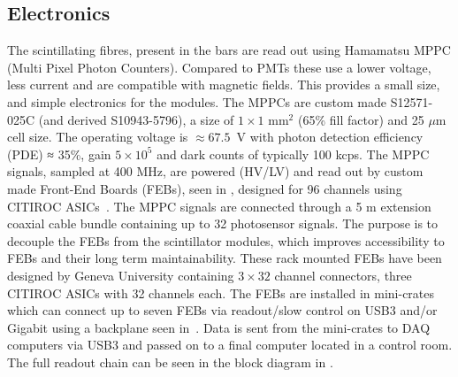 \subsection{Electronics}
The scintillating fibres, present in the bars are read out using Hamamatsu MPPC (Multi Pixel Photon Counters). Compared to PMTs these use a lower voltage, less current and are compatible with magnetic fields. This provides a small size, and simple electronics for the modules. The MPPCs are custom made S12571-025C (and derived S10943-5796), a size of $1\times1$ mm$^2$ (65\% fill factor) and 25 $\mu$m cell size. The operating voltage is $\approx 67.5$~V with photon detection efficiency (PDE) ≈ 35\%, gain $5 \times 10^5$ and dark counts of typically 100 kcps. The MPPC signals, sampled at 400 MHz, are powered (HV/LV) and read out by custom made Front-End Boards (FEBs), seen in , designed for 96 channels using CITIROC ASICs~\cite{78EASIROC}. The MPPC signals are connected through a 5 m extension coaxial cable bundle containing up to 32 photosensor signals. The purpose is to decouple the FEBs from the scintillator modules, which improves accessibility to FEBs and their long term maintainability. These rack mounted FEBs have been designed by Geneva University containing $3 \times 32$ channel connectors, three CITIROC ASICs with 32 channels each. The FEBs are installed in mini-crates which can connect up to seven FEBs via readout/slow control on USB3 and/or Gigabit using a backplane seen in~. 
Data is sent from the mini-crates to DAQ computers via USB3 and passed on to a final computer located in a control room. The full readout chain can be seen in the block diagram in .




